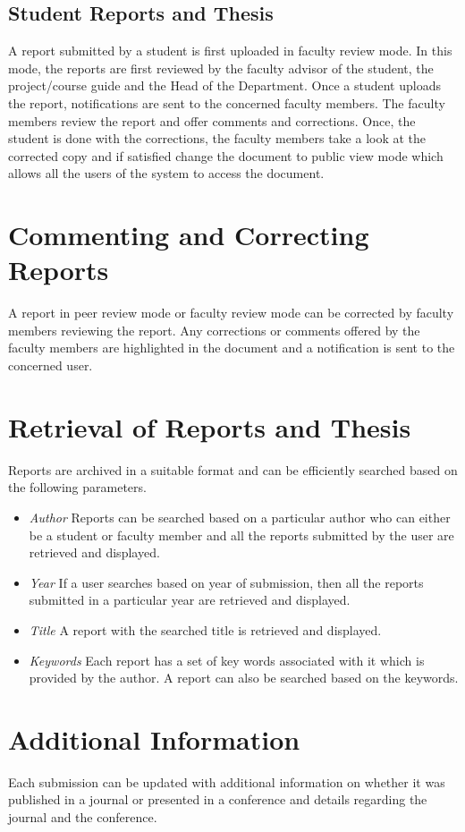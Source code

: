 \documentclass{article}
\begin{document}
\subsection{Student Reports and Thesis}

A report submitted by a student is first uploaded in faculty review mode. In this mode, the reports are first reviewed by the faculty advisor of the student, the project/course guide and the Head of the Department. Once a student uploads the report, notifications are sent to the concerned faculty members. The faculty members review the report and offer comments and corrections. Once, the student is done with the corrections, the faculty members take a look at the corrected copy and if satisfied change the document to public view mode which allows all the users of the system to access the document.

\section{Commenting and Correcting Reports}

A report in peer review mode or faculty review mode can be corrected by faculty members reviewing the report. Any corrections or comments offered by the faculty members are highlighted in the document and a notification is sent to the concerned user.

\section{Retrieval of Reports and Thesis}
Reports are archived in a suitable format and can be efficiently searched based on the following parameters.

\begin{itemize}
\item \textit{Author} Reports can be searched based on a particular author who can either be a student or faculty member and all the reports submitted by the user are retrieved and displayed.

\item \textit{Year} If a user searches based on year of submission, then all the reports submitted in a particular year are retrieved and displayed.

\item \textit{Title} A report with the searched title is retrieved and displayed.

\item \textit{Keywords} Each report has a set of key words associated with it which is provided by the author. A report can also be searched based on the keywords. 
\end{itemize} 

\section{Additional Information}
Each submission can be updated with additional information on whether it was published in a journal or presented in a conference and details regarding the journal and the conference.
   
\end{document}
